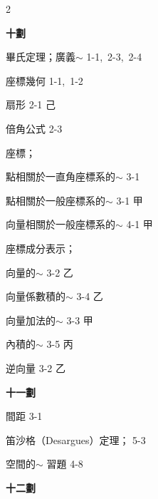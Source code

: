 \begin{multicols}{2}
\vspace{0.8em}
\begin{center}
\textbf{\large 十\quad 劃}
\end{center}

\noindent 畢氏定理；廣義$\sim$ \hfill 1-1,\, 2-3,\, 2-4\par
\noindent 座標幾何 \hfill 1-1,\, 1-2\par
\noindent 扇形 \hfill 2-1 己\par
\noindent 倍角公式 \hfill 2-3\par
\noindent 座標；\par
\noindent\hspace*{1.5em} 點相關於一直角座標系的$\sim$ \hfill 3-1\par
\noindent\hspace*{1.5em} 點相關於一般座標系的$\sim$ \hfill 3-1 甲\par
\noindent\hspace*{1.5em} 向量相關於一般座標系的$\sim$ \hfill 4-1 甲\par
\noindent 座標成分表示；\par
\noindent\hspace*{1.5em} 向量的$\sim$ \hfill 3-2 乙\par
\noindent\hspace*{1.5em} 向量係數積的$\sim$ \hfill 3-4 乙\par
\noindent\hspace*{1.5em} 向量加法的$\sim$ \hfill 3-3 甲\par
\noindent\hspace*{1.5em} 內積的$\sim$ \hfill 3-5 丙\par
\noindent 逆向量 \hfill 3-2 乙\par

\vspace{0.8em}
\begin{center}
\textbf{\large 十一劃}
\end{center}

\noindent 間距 \hfill 3-1\par
\noindent 笛沙格（Desargues）定理； \hfill 5-3\par
\noindent\hspace*{1.5em} 空間的$\sim$ \hfill 習題 4-8\par

\vspace{0.8em}
\begin{center}
\textbf{\large 十二劃}
\end{center}


\end{multicols}
